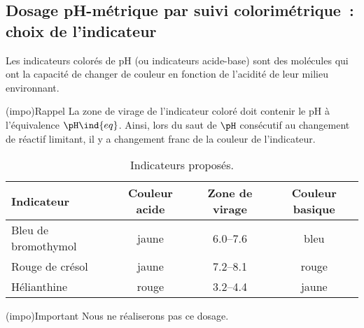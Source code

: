 \documentclass[../main/main.tex]{subfiles}
\begin{document}

\subsection{Dosage pH-métrique par suivi colorimétrique~: choix de l'indicateur}

Les indicateurs colorés de pH (ou indicateurs acide-base) sont des molécules qui
ont la capacité de changer de couleur en fonction de l'acidité de leur milieu
environnant.

\begin{tcb}(impo){Rappel}
	La zone de virage de l'indicateur coloré doit contenir le pH à l'équivalence
	$\pH\ind{eq}$. Ainsi, lors du saut de $\pH$ consécutif au changement de
	réactif limitant, il y a changement franc de la couleur de l'indicateur.
\end{tcb}

\begin{table}[h!]
	\centering
	\caption{Indicateurs proposés.}
	\label{tab:ind}
	\begin{tabular}{lccc}
		\toprule
		Indicateur          & Couleur acide & Zone de virage       & Couleur basique
		\\\midrule
		Bleu de bromothymol & jaune         & \SIrange{6.0}{7.6}{} & bleu
		\\
		Rouge de crésol     & jaune         & \SIrange{7.2}{8.1}{} & rouge
		\\
		Hélianthine         & rouge         & \SIrange{3.2}{4.4}{} & jaune
		\\\bottomrule
	\end{tabular}
\end{table}


\begin{tcb}(impo){Important}
	Nous ne réaliserons pas ce dosage.
\end{tcb}
\end{document}

